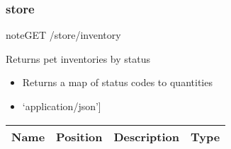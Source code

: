 \documentclass[letterpaper,10pt,english]{sphinxmanual}
\begin{document}
\subsubsection{store}
\label{\detokenize{dev-guide:store}}
\begin{sphinxadmonition}{note}{GET /store/inventory}

Returns pet inventories by status\begin{itemize}
\item {} 
Returns a map of status codes to quantities

\item {} 
\sphinxstylestrong{Produces: 
}{[}‘application/json’{]}

\end{itemize}




\begin{savenotes}\sphinxattablestart
\centering
\begin{tabulary}{\linewidth}[t]{|T|T|T|T|}
\hline
\sphinxstyletheadfamily 
Name
&\sphinxstyletheadfamily 
Position
&\sphinxstyletheadfamily 
Description
&\sphinxstyletheadfamily 
Type
\\
\hline
\end{tabulary}
\par
\sphinxattableend\end{savenotes}


\end{sphinxadmonition}
\end{document}
